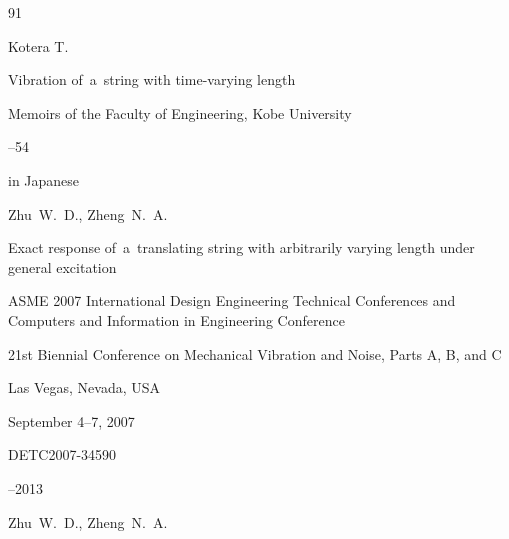 \begin{thebibliography}{91}














\by Kotera T.

\paper Vibration of~a~string with time-varying length

\serial Memoirs of the Faculty of Engineering, Kobe University



--54

\lang in Japanese






\by Zhu~W.~D., Zheng~N.~A.

\paper Exact response of~a~translating string with arbitrarily varying length under general excitation

\inbook ASME 2007 International Design Engineering Technical Conferences and Computers and Information in Engineering Conference


\volinfo 21st Biennial Conference on Mechanical Vibration and Noise, Parts A, B, and C

\publaddr Las Vegas, Nevada, USA

\procinfo September 4–7, 2007


\papernumber DETC2007-34590

--2013






\by Zhu~W.~D., Zheng~N.~A.


\end{thebibliography}
